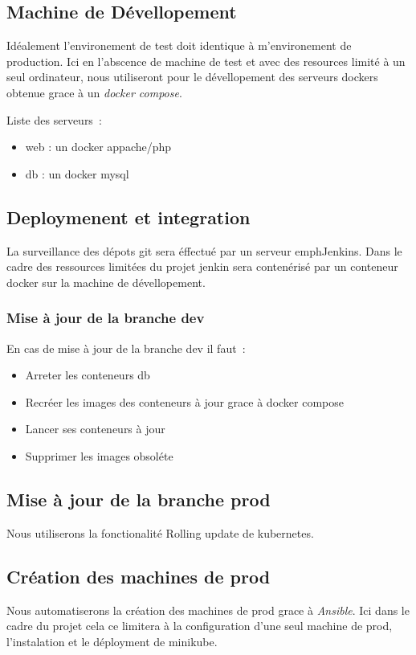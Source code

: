 \subsection{Machine de Dévellopement}
Idéalement l'environement de test doit identique à m'environement de production. Ici en l'abscence de machine de test et avec des resources limité à un seul ordinateur, nous utiliseront pour le dévellopement des serveurs dockers obtenue grace à un \emph{docker compose}.

Liste des serveurs~:
\begin{itemize}
\item web : un docker appache/php
\item db : un docker mysql
\end{itemize}

\subsection{Deploymenent et integration}
La surveillance des dépots git sera éffectué par un serveur emph{Jenkins}. Dans le cadre des ressources limitées du projet jenkin sera contenérisé par un conteneur docker sur la machine de dévellopement.

\subsubsection{Mise à jour de la branche dev}
En cas de mise à jour de la branche dev il faut~:
\begin{itemize}
\item Arreter les conteneurs db
\item Recréer les images des conteneurs à jour grace à docker compose
\item Lancer ses conteneurs à jour
\item Supprimer les images obsoléte
\end{itemize}

\subsection{Mise à jour de la branche prod}
Nous utiliserons la fonctionalité Rolling update de kubernetes.

\subsection{Création des machines de prod}
Nous automatiserons la création des machines de prod grace à \emph{Ansible}.
Ici dans le cadre du projet cela ce limitera à la configuration d'une seul machine de prod, l'instalation et le déployment de minikube.


